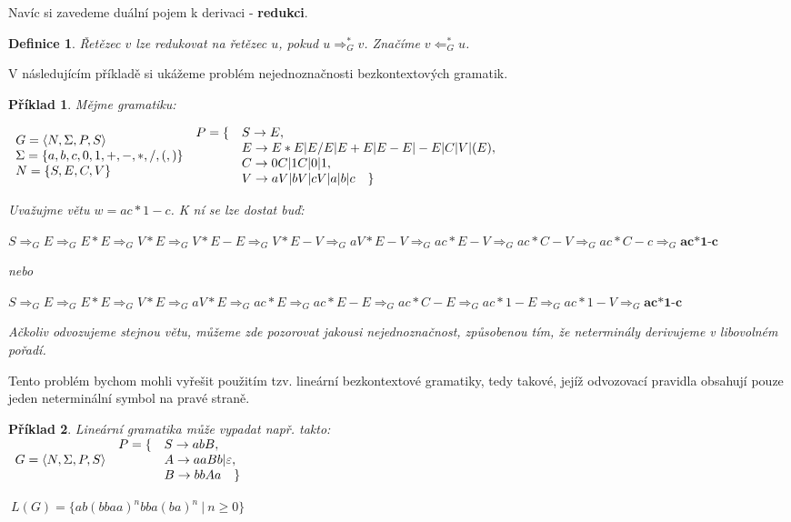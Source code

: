 \documentclass[10pt, a4paper, titlepage]{article}
\theoremstyle{note}
\newtheorem{definice}{\textbf{Definice}}
\newtheorem{priklad}{\textbf{Příklad}}
\begin{document}
Navíc si zavedeme duální pojem k derivaci - \textbf{redukci}.
\begin{definice}
Řetězec $v$ lze redukovat na řetězec $u$, pokud $u \Rightarrow_G^* v$. Značíme
$v \Leftarrow_G^* u$. 
\end{definice}
V následujícím příkladě si ukážeme problém nejednoznačnosti bezkontextových gramatik.
\begin{priklad}\label{priklad-6}
Mějme gramatiku:

$\begin{array}{l}
G=\langle N,\Sigma,P,S \rangle \\
\Sigma = \lbrace a,b,c,0,1,+,-,*,/,(,) \rbrace \\
N = \lbrace S,E,C,V \rbrace \\
\end{array}\\
\begin{array}{l l}
P= \lbrace &S \rightarrow E, \\
& E \rightarrow E*E|E/E|E+E|E-E|-E|C|V|(E), \\
& C \rightarrow 0C|1C|0|1, \\
& V \rightarrow aV|bV|cV|a|b|c \quad \rbrace
\end{array}
$

Uvažujme větu $w=ac*1-c$. K ní se lze dostat buď:

$
S \Rightarrow_G E \Rightarrow_G E*E \Rightarrow_G V*E \Rightarrow_G V*E-E \Rightarrow_G V*E-V \Rightarrow_G aV*E-V \Rightarrow_G ac*E-V \Rightarrow_G ac*C-V \Rightarrow_G ac*C-c \Rightarrow_G \textbf{ac*1-c}
$

nebo

$
S \Rightarrow_G E \Rightarrow_G E*E \Rightarrow_G V*E \Rightarrow_G aV*E \Rightarrow_G ac*E \Rightarrow_G ac*E-E \Rightarrow_G ac*C-E \Rightarrow_G ac*1-E \Rightarrow_G ac*1-V \Rightarrow_G \textbf{ac*1-c}
$

Ačkoliv odvozujeme stejnou větu, můžeme zde pozorovat jakousi nejednoznačnost, způsobenou tím, že neterminály derivujeme v libovolném pořadí.
\end{priklad}
Tento problém bychom mohli vyřešit použitím tzv. lineární bezkontextové gramatiky, tedy takové, jejíž odvozovací pravidla obsahují pouze jeden neterminální symbol na pravé straně.
\begin{priklad}Lineární gramatika může vypadat např. takto: \\
$\begin{array}{l}
G=\langle N,\Sigma,P,S \rangle \\
\end{array}\\
\begin{array}{l l}
P= \lbrace &S \rightarrow abB, \\
& A \rightarrow aaBb|\varepsilon, \\
& B \rightarrow bbAa \quad \rbrace
\end{array}
$

$\ L(G) = \lbrace ab(bbaa)^nbba(ba)^n\ |\ n \ge0 \rbrace$
\end{priklad}
\end{document}
